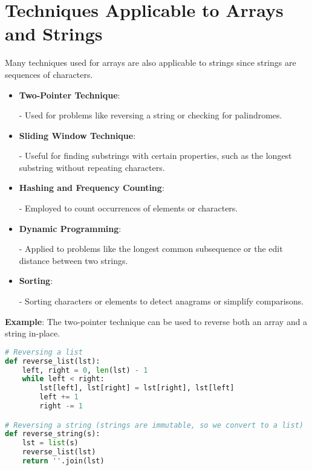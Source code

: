 \section{Techniques Applicable to Arrays and Strings}\label{sec:techniques_arrays_strings}

Many techniques used for arrays are also applicable to strings since strings are sequences of characters.

\begin{itemize}
    \item \textbf{Two-Pointer Technique}:

    - Used for problems like reversing a string or checking for palindromes.

    \item \textbf{Sliding Window Technique}:

    - Useful for finding substrings with certain properties, such as the longest substring without repeating characters.

    \item \textbf{Hashing and Frequency Counting}:

    - Employed to count occurrences of elements or characters.

    \item \textbf{Dynamic Programming}:

    - Applied to problems like the longest common subsequence or the edit distance between two strings.

    \item \textbf{Sorting}:

    - Sorting characters or elements to detect anagrams or simplify comparisons.

\end{itemize}

\textbf{Example}: The two-pointer technique can be used to reverse both an array and a string in-place.

\begin{fullwidth}
\begin{lstlisting}[language=Python, caption=Reversing a list and a string using the two-pointer technique]
# Reversing a list
def reverse_list(lst):
    left, right = 0, len(lst) - 1
    while left < right:
        lst[left], lst[right] = lst[right], lst[left]
        left += 1
        right -= 1

# Reversing a string (strings are immutable, so we convert to a list)
def reverse_string(s):
    lst = list(s)
    reverse_list(lst)
    return ''.join(lst)
\end{lstlisting}
\end{fullwidth}

